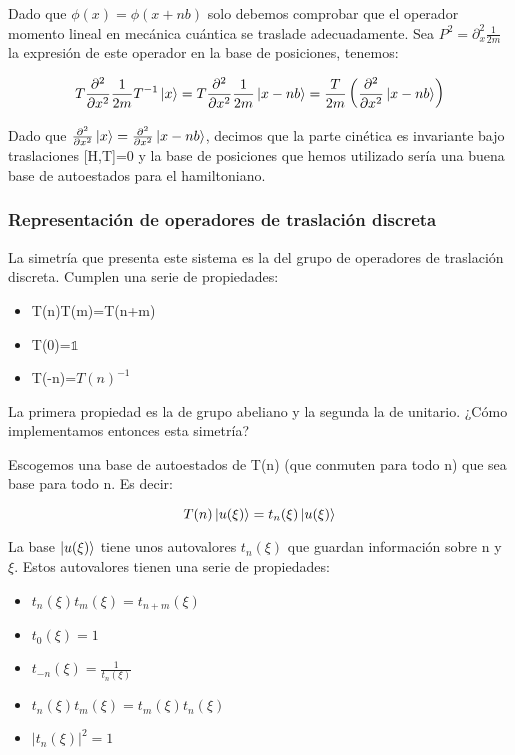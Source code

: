 \documentclass{article}
\begin{document}
Dado que $\phi (x)=\phi (x+nb)$ solo debemos comprobar que el operador momento lineal en mecánica cuántica se traslade adecuadamente. Sea $P^2=\partial ^2_x\frac{1}{2m}$ la expresión de este operador en la base de posiciones, tenemos:

$$T\frac{\partial ^2}{\partial x^2}\frac{1}{2m}T^{-1}\ket{x}=T\frac{\partial ^2}{\partial x^2}\frac{1}{2m}\ket{x-nb}=\frac{T}{2m}\left ( \frac{\partial ^2}{\partial x^2}\ket{x-nb}\right)$$

Dado que $\frac{\partial ^2}{\partial x^2}\ket{x}=\frac{\partial ^2}{\partial x^2}\ket{x-nb}$, decimos que la parte cinética es invariante bajo traslaciones [H,T]=0 y la base de posiciones que hemos utilizado sería una buena base de autoestados para el hamiltoniano.

\newpage
\subsubsection{Representación de operadores de traslación discreta}
La simetría que presenta este sistema es la del grupo de operadores de traslación discreta. Cumplen una serie de propiedades:

\begin{itemize}

\item T(n)T(m)=T(n+m)

\item T(0)=$\mathds{1}$

\item T(-n)=$T(n)^{-1}$

\end{itemize}

La primera propiedad es la de grupo abeliano y la segunda la de unitario. ¿Cómo implementamos entonces esta simetría?

Escogemos una base de autoestados de T(n) (que conmuten para todo n) que sea base para todo n. Es decir:

$$T(n) \ket{u(\xi)}=t_n(\xi)\ket{u(\xi)}$$

La base $\ket{u(\xi)}$ tiene unos autovalores $t_n(\xi)$ que guardan información sobre n y $\xi$. Estos autovalores tienen una serie de propiedades:

\begin{itemize}
    \item $t_n (\xi) t_m(\xi) = t_{n+m}(\xi)$
    \item $t_0(\xi)=1$
    \item $t_{-n}(\xi)=\frac{1}{t_n(\xi)}$
    \item $t_n(\xi)t_m(\xi)=t_m(\xi)t_n(\xi)$
    \item $|t_n(\xi)|^2=1$
\end{itemize}
\end{document}
